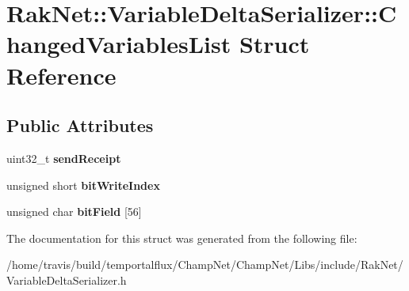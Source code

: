 \hypertarget{struct_rak_net_1_1_variable_delta_serializer_1_1_changed_variables_list}{\section{Rak\-Net\-:\-:Variable\-Delta\-Serializer\-:\-:Changed\-Variables\-List Struct Reference}
\label{struct_rak_net_1_1_variable_delta_serializer_1_1_changed_variables_list}
}
\subsection*{Public Attributes}
\begin{DoxyCompactItemize}
\item 
\hypertarget{struct_rak_net_1_1_variable_delta_serializer_1_1_changed_variables_list_ad749e404b0818d537f9edf913260891d}{uint32\-\_\-t {\bfseries send\-Receipt}}\label{struct_rak_net_1_1_variable_delta_serializer_1_1_changed_variables_list_ad749e404b0818d537f9edf913260891d}

\item 
\hypertarget{struct_rak_net_1_1_variable_delta_serializer_1_1_changed_variables_list_a8a88e8f27be5ad888738bdfbd7dad596}{unsigned short {\bfseries bit\-Write\-Index}}\label{struct_rak_net_1_1_variable_delta_serializer_1_1_changed_variables_list_a8a88e8f27be5ad888738bdfbd7dad596}

\item 
\hypertarget{struct_rak_net_1_1_variable_delta_serializer_1_1_changed_variables_list_a7e569d13ccd4eaf40d047b184c14a7f5}{unsigned char {\bfseries bit\-Field} \mbox{[}56\mbox{]}}\label{struct_rak_net_1_1_variable_delta_serializer_1_1_changed_variables_list_a7e569d13ccd4eaf40d047b184c14a7f5}

\end{DoxyCompactItemize}


The documentation for this struct was generated from the following file\-:\begin{DoxyCompactItemize}
\item 
/home/travis/build/temportalflux/\-Champ\-Net/\-Champ\-Net/\-Libs/include/\-Rak\-Net/Variable\-Delta\-Serializer.\-h\end{DoxyCompactItemize}
